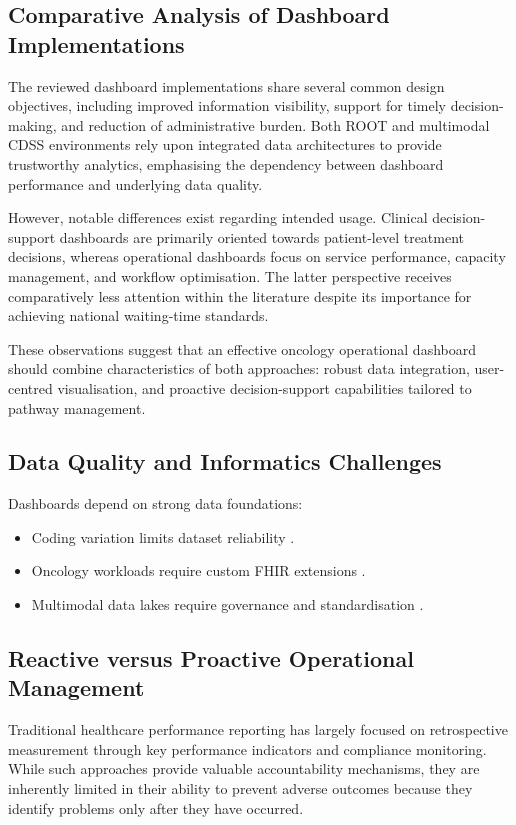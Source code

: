 \subsection{Comparative Analysis of Dashboard Implementations}
The reviewed dashboard implementations share several common design objectives, including improved information visibility, support for timely decision-making, and reduction of administrative burden. Both ROOT and multimodal CDSS environments rely upon integrated data architectures to provide trustworthy analytics, emphasising the dependency between dashboard performance and underlying data quality.

However, notable differences exist regarding intended usage. Clinical decision-support dashboards are primarily oriented towards patient-level treatment decisions, whereas operational dashboards focus on service performance, capacity management, and workflow optimisation. The latter perspective receives comparatively less attention within the literature despite its importance for achieving national waiting-time standards.

These observations suggest that an effective oncology operational dashboard should combine characteristics of both approaches: robust data integration, user-centred visualisation, and proactive decision-support capabilities tailored to pathway management.

\subsection{Data Quality and Informatics Challenges}

Dashboards depend on strong data foundations:

\begin{itemize}
    \item Coding variation limits dataset reliability \citep{varma2026}.
    \item Oncology workloads require custom FHIR extensions \citep{guilbert2024}.
    \item Multimodal data lakes require governance and standardisation \citep{conway2025}.
\end{itemize}

\subsection{Reactive versus Proactive Operational Management}

Traditional healthcare performance reporting has largely focused on retrospective measurement through key performance indicators and compliance monitoring. While such approaches provide valuable accountability mechanisms, they are inherently limited in their ability to prevent adverse outcomes because they identify problems only after they have occurred.

